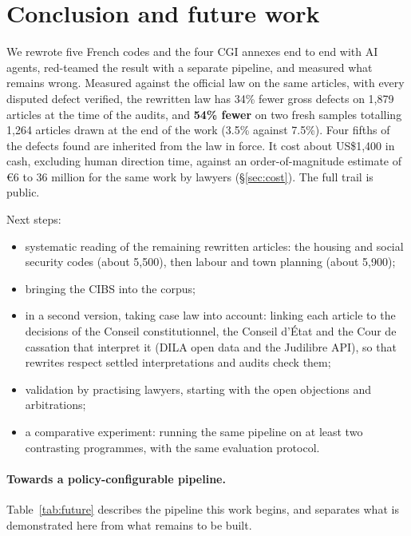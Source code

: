 \documentclass[11pt,a4paper]{article}
\begin{document}
\section{Conclusion and future work}

We rewrote five French codes and the four CGI annexes end to end with AI agents, red-teamed the result with a separate pipeline, and measured what remains wrong. Measured against the official law on the same articles, with every disputed defect verified, the rewritten law has 34\% fewer gross defects on 1{,}879 articles at the time of the audits, and \textbf{54\% fewer} on two fresh samples totalling 1{,}264 articles drawn at the end of the work (3.5\% against 7.5\%). Four fifths of the defects found are inherited from the law in force. It cost about US\$1{,}400 in cash, excluding human direction time, against an order-of-magnitude estimate of \euro{}6 to 36 million for the same work by lawyers (\S\ref{sec:cost}). The full trail is public.

Next steps:
\begin{itemize}
  \item systematic reading of the remaining rewritten articles: the housing and social security codes (about 5{,}500), then labour and town planning (about 5{,}900);
  \item bringing the CIBS into the corpus;
  \item in a second version, taking case law into account: linking each article to the decisions of the Conseil constitutionnel, the Conseil d'État and the Cour de cassation that interpret it (DILA open data and the Judilibre API), so that rewrites respect settled interpretations and audits check them;
  \item validation by practising lawyers, starting with the open objections and arbitrations;
  \item a comparative experiment: running the same pipeline on at least two contrasting programmes, with the same evaluation protocol.
\end{itemize}

\paragraph{Towards a policy-configurable pipeline.}
Table~\ref{tab:future} describes the pipeline this work begins, and separates what is demonstrated here from what remains to be built.
\end{document}
